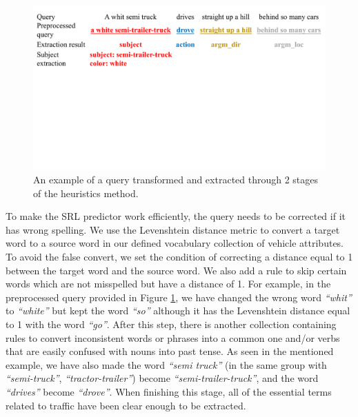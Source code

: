 \begin{figure}[t!]
    \centering
    \includegraphics[width=\textwidth]{images/methods/text_extraction_example.pdf}
    \caption{An example of a query transformed and extracted through 2 stages of the heuristics method.}
    \label{fig:text_extraction_example}
\end{figure}
To make the SRL predictor work efficiently, the query needs to be corrected if it has wrong spelling. We use the Levenshtein distance metric to convert a target word to a source word in our defined vocabulary collection of vehicle attributes. To avoid the false convert, we set the condition of correcting a distance equal to 1 between the target word and the source word. We also add a rule to skip certain words which are not misspelled but have a distance of 1. For example, in the preprocessed query provided in Figure \ref{fig:text_extraction_example}, we have changed the wrong word \textit{“whit”} to \textit{“white”} but kept the word \textit{“so”} although it has the Levenshtein distance equal to 1 with the word \textit{“go”}. After this step, there is another collection containing rules to convert inconsistent words or phrases into a common one and/or verbs that are easily confused with nouns into past tense. As seen in the mentioned example, we have also made the word \textit{“semi truck”} (in the same group with \textit{“semi-truck”}, \textit{“tractor-trailer”}) become \textit{“semi-trailer-truck”}, and the word \textit{“drives”} become \textit{“drove”}. When finishing this stage, all of the essential terms related to traffic have been clear enough to be extracted.
